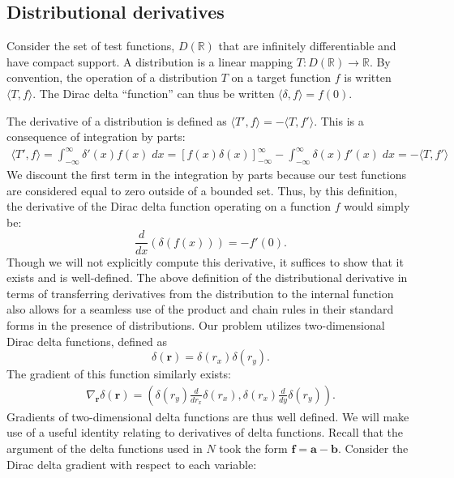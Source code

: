 \documentclass{article}
\begin{document}
\subsection{Distributional derivatives}
Consider the set of test functions, $D(\mathbb{R})$ that are infinitely differentiable and have compact support. A distribution is a linear mapping $T: D(\mathbb{R})\to\mathbb{R}$. By convention, the operation of a distribution $T$ on a target function $f$ is written $\langle T,f\rangle$. The Dirac delta ``function'' can thus be written $\langle \delta,f\rangle=f(0)$.

The derivative of a distribution is defined as $\langle T',f\rangle=-\langle T,f'\rangle$. This is a consequence of integration by parts:
\begin{eqnarray*}
\langle T',f\rangle=\int_{-\infty}^\infty \delta'(x)f(x)\;dx=\left[f(x)\delta(x)\right]_{-\infty}^\infty-\int_{-\infty}^\infty \delta(x)f'(x)\;dx=-\langle T,f'\rangle
\end{eqnarray*}We discount the first term in the integration by parts because our test functions are considered equal to zero outside of a bounded set. Thus, by this definition, the derivative of the Dirac delta function operating on a function $f$ would simply be:
\[\frac{d}{dx}(\delta(f(x)))=-f'(0).
\]Though we will not explicitly compute this derivative, it suffices to show that it exists and is well-defined. The above definition of the distributional derivative in terms of transferring derivatives from the distribution to the internal function also allows for a seamless use of the product and chain rules in their standard forms in the presence of distributions.  Our problem utilizes two-dimensional Dirac delta functions, defined as
\[\delta(\mathbf{r})=\delta(r_x)\delta(r_y).
\]The gradient of this function similarly exists:
\begin{eqnarray*}
\nabla_\mathbf{r}\delta(\mathbf{r})=\left(\delta(r_y)\frac{d}{dr_x}\delta(r_x),\delta(r_x)\frac{d}{dy}\delta(r_y)\right).
\end{eqnarray*}Gradients of two-dimensional delta functions are thus well defined. We will make use of a useful identity relating to derivatives of delta functions. Recall that the argument of the delta functions used in $N$ took the form $\mathbf{f}=\mathbf{a}-\mathbf{b}$. Consider the Dirac delta gradient with respect to each variable:
\end{document}
